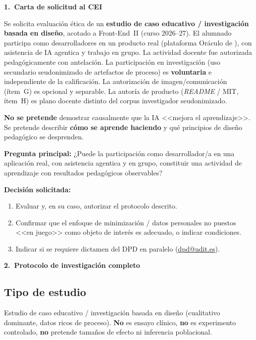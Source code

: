 \documentclass[11pt,a4paper]{scrartcl}
\newcommand{\AnnexTitle}[1]{%
  \clearpage
  \LogoRow
  \begin{center}{\Large\sffamily\bfseries #1}\end{center}
  \vspace{0.4em}
  \noindent{\color{rulegray}\hrule height 0.4pt}
  \vspace{0.5em}
}
\begin{document}
\AnnexTitle{1.\ Carta de solicitud al CEI}

Se solicita evaluación ética de un \textbf{estudio de caso educativo / investigación
basada en diseño}, acotado a Front-End~II (curso 2026--27). El alumnado participa
como desarrolladores en un producto real (plataforma Oráculo de \TTODfull), con asistencia
de IA agentica y trabajo en grupo. La actividad docente fue autorizada
pedagógicamente con antelación. La participación en investigación (uso secundario
seudonimizado de artefactos de proceso) es \textbf{voluntaria} e independiente de
la calificación. La autorización de imagen/comunicación (ítem~G) es opcional y separable.
La autoría de producto (\emph{README} / MIT, ítem~H) es plano docente distinto del corpus
investigador seudonimizado.

\textbf{No se pretende} demostrar causalmente que la IA <<mejora el aprendizaje>>.
Se pretende describir \textbf{cómo se aprende haciendo} y qué principios de diseño
pedagógico se desprenden.

\textbf{Pregunta principal:} ¿Puede la participación como desarrollador/a en una
aplicación real, con asistencia agentica y en grupo, constituir una actividad de
aprendizaje con resultados pedagógicos observables?

\textbf{Decisión solicitada:}
\begin{enumerate}
  \item Evaluar y, en su caso, autorizar el protocolo descrito.
  \item Confirmar que el enfoque de minimización / datos personales no puestos
        <<en juego>> como objeto de interés es adecuado, o indicar condiciones.
  \item Indicar si se requiere dictamen del DPD en paralelo
        (\href{mailto:dpd@udit.es}{dpd@udit.es}).
\end{enumerate}

\AnnexTitle{2.\ Protocolo de investigación completo}

\subsection*{Tipo de estudio}
Estudio de caso educativo / investigación basada en diseño (cualitativo dominante,
datos ricos de proceso). \textbf{No} es ensayo clínico, \textbf{no} es experimento
controlado, \textbf{no} pretende tamaños de efecto ni inferencia poblacional.
\end{document}
